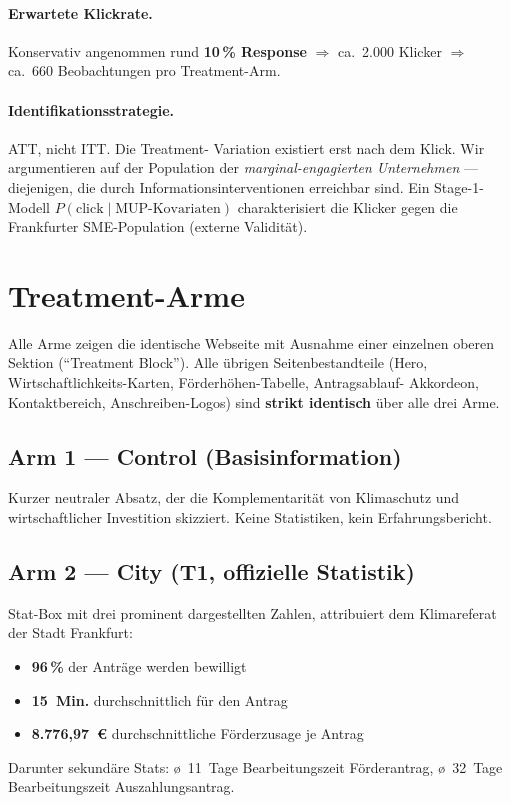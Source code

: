 \documentclass[11pt, a4paper]{scrartcl}
\begin{document}
\paragraph{Erwartete Klickrate.} Konservativ angenommen rund
\textbf{10\,\% Response} $\Rightarrow$ ca.~2.000 Klicker $\Rightarrow$
ca.~660 Beobachtungen pro Treatment-Arm.

\paragraph{Identifikationsstrategie.} ATT, nicht ITT. Die Treatment-
Variation existiert erst nach dem Klick. Wir argumentieren auf der
Population der \emph{marginal-engagierten Unternehmen} --- diejenigen,
die durch Informationsinterventionen erreichbar sind. Ein Stage-1-Modell
\(P(\text{click} \mid \text{MUP-Kovariaten})\) charakterisiert die Klicker
gegen die Frankfurter SME-Population (externe Validität).

\section{Treatment-Arme}

Alle Arme zeigen die identische Webseite mit Ausnahme einer einzelnen
oberen Sektion (\enquote{Treatment Block}). Alle übrigen Seitenbestandteile
(Hero, Wirtschaftlichkeits-Karten, Förderhöhen-Tabelle, Antragsablauf-
Akkordeon, Kontaktbereich, Anschreiben-Logos) sind \textbf{strikt identisch}
über alle drei Arme.

\subsection*{Arm 1 --- Control (Basisinformation)}
Kurzer neutraler Absatz, der die Komplementarität von Klimaschutz und
wirtschaftlicher Investition skizziert. Keine Statistiken, kein
Erfahrungsbericht.

\subsection*{Arm 2 --- City (T1, offizielle Statistik)}
Stat-Box mit drei prominent dargestellten Zahlen, attribuiert dem
Klimareferat der Stadt Frankfurt:
\begin{itemize}
    \item \textbf{96\,\%} der Anträge werden bewilligt
    \item \textbf{15~Min.} durchschnittlich für den Antrag
    \item \textbf{8.776,97~\euro} durchschnittliche Förderzusage je Antrag
\end{itemize}
Darunter sekundäre Stats: ø~11~Tage Bearbeitungszeit Förderantrag,
ø~32~Tage Bearbeitungszeit Auszahlungsantrag.
\end{document}

